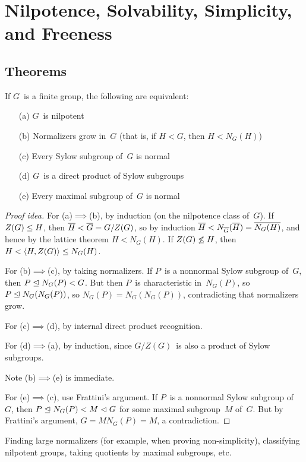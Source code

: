 %
%
%
\section{Nilpotence, Solvability, Simplicity, and Freeness}
\subsection*{Theorems}
\begin{thm}
If \(G\)~is a finite group, the following are equivalent:
\begin{enumerate}[itemsep=0pt]
\item[(a)] \(G\)~is nilpotent
\item[(b)] Normalizers grow in~\(G\) (that is, if \(H<G\), then \(H<N_G(H)\))
\item[(c)] Every Sylow subgroup of~\(G\) is normal
\item[(d)] \(G\)~is a direct product of Sylow subgroups
\item[(e)] Every maximal subgroup of~\(G\) is normal
\end{enumerate}
\end{thm}
\begin{proof}[Proof idea]
For (a)\(\implies\)(b), by induction (on the nilpotence class of~\(G\)). If \(Z(G)\le H\), then \(\overline{H}<\overline{G}=G/Z(G)\), so by induction \(\overline{H}<N_{\overline{G}}(\overline{H})=\overline{N_G(H)}\), and hence by the lattice theorem \(H<N_G(H)\). If \(Z(G)\not\le H\), then \(H<\langle{H,Z(G)}\rangle\le N_G(H)\).

For (b)\(\implies\)(c), by taking normalizers. If \(P\)~is a nonnormal Sylow subgroup of~\(G\), then \(P\trianglelefteq N_G(P)<G\). But then \(P\)~is characteristic in~\(N_G(P)\), so \(P\trianglelefteq N_G(N_G(P))\), so \(N_G(P)=N_G(N_G(P))\), contradicting that normalizers grow.

For (c)\(\implies\)(d), by internal direct product recognition.

For (d)\(\implies\)(a), by induction, since \(G/Z(G)\)~is also a product of Sylow subgroups.

Note (b)\(\implies\)(e) is immediate. 

For (e)\(\implies\)(c), use Frattini's argument. If \(P\)~is a nonnormal Sylow subgroup of~\(G\), then \(P\trianglelefteq N_G(P)<M\vartriangleleft G\) for some maximal subgroup~\(M\) of~\(G\). But by Frattini's argument, \(G=MN_G(P)=M\), a contradiction.
\end{proof}
\begin{app}
Finding large normalizers (for example, when proving non-simplicity), classifying nilpotent groups, taking quotients by maximal subgroups, etc.
\end{app}

